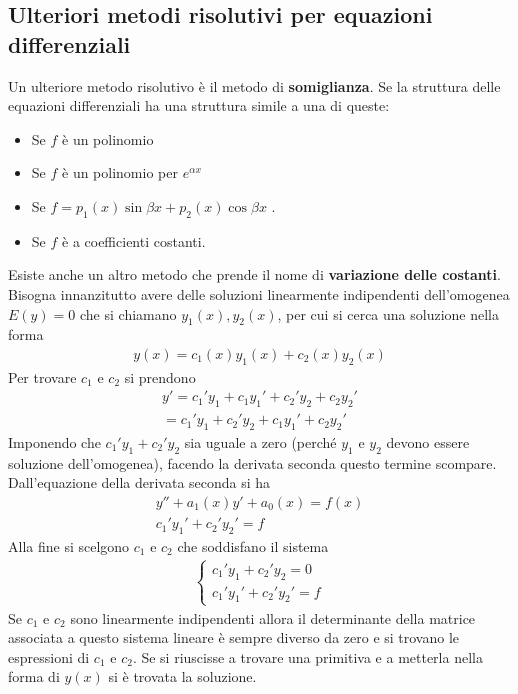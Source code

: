 \documentclass[a4paper, oneside]{book}
\begin{document}
\subsection{Ulteriori metodi risolutivi per equazioni differenziali}
Un ulteriore metodo risolutivo è il metodo di \textbf{somiglianza}. Se la struttura delle equazioni differenziali
ha una struttura simile a una di queste:
\begin{itemize}
    \item Se $f$ è un polinomio
    \item Se $f$ è un polinomio per $e^{\alpha x}$ 
    \item Se $f = p_1(x) \sin\beta x + p_2(x)\cos\beta x$ . 
    \item Se $f$ è a coefficienti costanti.
\end{itemize}
Esiste anche un altro metodo che prende il nome di \textbf{variazione delle costanti}.
Bisogna innanzitutto avere delle soluzioni linearmente indipendenti dell'omogenea $E(y) = 0$ che si chiamano $y_1(x), y_2(x)$,
per cui si cerca una soluzione nella forma
\begin{gather*}
    y(x) = c_1(x)y_1(x) + c_2(x)y_2(x)
\end{gather*}
Per trovare $c_1$ e $c_2$ si prendono 
\begin{gather*}
    y' = c_1' y_1 + c_1y_1' + c_2'y_2 + c_2 y_2' \\
    = c_1' y_1 + c_2' y_2 + c_1 y_1' + c_2 y_2'
\end{gather*}
Imponendo che $c_1' y_1 + c_2' y_2$ sia uguale a zero (perché
$y_1$ e $y_2$ devono essere soluzione dell'omogenea), facendo la 
derivata seconda questo termine scompare. Dall'equazione della derivata seconda si ha
\begin{gather*}
    y'' + a_1(x)y' + a_0(x) = f(x)  \\
    c_1'y_1' + c_2'y_2' = f
\end{gather*}
Alla fine si scelgono $c_1$ e $c_2$ che soddisfano il sistema 
\begin{gather*}
    \left\{\begin{array}{l}
        c_1' y_1 + c_2' y_2 = 0 \\
        c_1' y_1' + c_2' y_2' = f
    \end{array}\right.
\end{gather*}
Se $c_1$ e $c_2$ sono linearmente indipendenti allora il determinante della matrice
associata a questo sistema lineare è sempre
diverso da zero e si trovano le espressioni di $c_1$ e $c_2$. Se si riuscisse a trovare
una primitiva e a metterla nella forma di $y(x)$ si è trovata la soluzione. 
\end{document}
